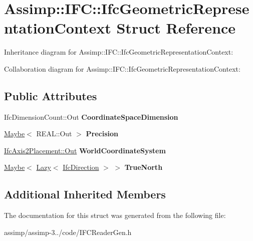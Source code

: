 \hypertarget{struct_assimp_1_1_i_f_c_1_1_ifc_geometric_representation_context}{\section{Assimp\+:\+:I\+F\+C\+:\+:Ifc\+Geometric\+Representation\+Context Struct Reference}
\label{struct_assimp_1_1_i_f_c_1_1_ifc_geometric_representation_context}
}


Inheritance diagram for Assimp\+:\+:I\+F\+C\+:\+:Ifc\+Geometric\+Representation\+Context\+:


Collaboration diagram for Assimp\+:\+:I\+F\+C\+:\+:Ifc\+Geometric\+Representation\+Context\+:
\subsection*{Public Attributes}
\begin{DoxyCompactItemize}
\item 
\hypertarget{struct_assimp_1_1_i_f_c_1_1_ifc_geometric_representation_context_abd2e2006a60f45e71cdc0d1bc43d9925}{Ifc\+Dimension\+Count\+::\+Out {\bfseries Coordinate\+Space\+Dimension}}\label{struct_assimp_1_1_i_f_c_1_1_ifc_geometric_representation_context_abd2e2006a60f45e71cdc0d1bc43d9925}

\item 
\hypertarget{struct_assimp_1_1_i_f_c_1_1_ifc_geometric_representation_context_a422a560699822eb5f6c7427fbec5c5fd}{\hyperlink{struct_assimp_1_1_s_t_e_p_1_1_maybe}{Maybe}$<$ R\+E\+A\+L\+::\+Out $>$ {\bfseries Precision}}\label{struct_assimp_1_1_i_f_c_1_1_ifc_geometric_representation_context_a422a560699822eb5f6c7427fbec5c5fd}

\item 
\hypertarget{struct_assimp_1_1_i_f_c_1_1_ifc_geometric_representation_context_ab34f4a27fd891458b6d50cc57b7c8922}{\hyperlink{classboost_1_1shared__ptr}{Ifc\+Axis2\+Placement\+::\+Out} {\bfseries World\+Coordinate\+System}}\label{struct_assimp_1_1_i_f_c_1_1_ifc_geometric_representation_context_ab34f4a27fd891458b6d50cc57b7c8922}

\item 
\hypertarget{struct_assimp_1_1_i_f_c_1_1_ifc_geometric_representation_context_a5c0e15b9012a92e35f2890c5be72335a}{\hyperlink{struct_assimp_1_1_s_t_e_p_1_1_maybe}{Maybe}$<$ \hyperlink{struct_assimp_1_1_s_t_e_p_1_1_lazy}{Lazy}$<$ \hyperlink{struct_assimp_1_1_i_f_c_1_1_ifc_direction}{Ifc\+Direction} $>$ $>$ {\bfseries True\+North}}\label{struct_assimp_1_1_i_f_c_1_1_ifc_geometric_representation_context_a5c0e15b9012a92e35f2890c5be72335a}

\end{DoxyCompactItemize}
\subsection*{Additional Inherited Members}


The documentation for this struct was generated from the following file\+:\begin{DoxyCompactItemize}
\item 
assimp/assimp-\/3../code/I\+F\+C\+Reader\+Gen.\+h\end{DoxyCompactItemize}
